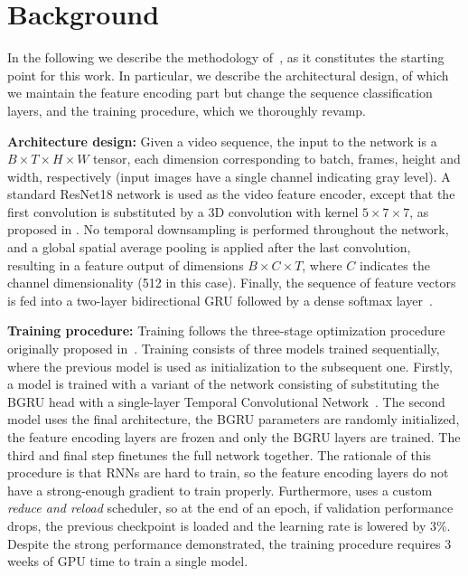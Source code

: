 \documentclass{article}
\begin{document}
\section{Background}

In the following we describe the methodology of~\cite{petridis18}, as it constitutes the starting point for this work. In particular, we describe the architectural design, of which we maintain the feature encoding part but change the sequence classification layers, and the training procedure, which we thoroughly revamp.

\textbf{Architecture design:} Given a video sequence, the input to the network is a $B\times T \times H \times W$ tensor, each dimension corresponding to batch, frames, height and width, respectively (input images have a single channel indicating gray level). A standard ResNet18 network is used as the video feature encoder, except that the first convolution is substituted by a 3D convolution with kernel $5 \times 7 \times 7$, as proposed in \cite{stafylakis17}. No temporal downsampling is performed throughout the network, and a global spatial average pooling is applied after the last convolution, resulting in a feature output of dimensions $B \times C \times T$, where $C$ indicates the channel dimensionality (512 in this case). Finally, the sequence of feature vectors is fed into a two-layer bidirectional GRU followed by a dense softmax layer~\cite{petridis18}. 

\textbf{Training procedure:} Training follows the three-stage optimization procedure originally proposed in~\cite{stafylakis17}. Training consists of three models trained sequentially, where the previous model is used as initialization to the subsequent one. Firstly, a model is trained with a variant of the network consisting of substituting the BGRU head with a single-layer Temporal Convolutional Network~\cite{BaiTCN2018}. The second model uses the final architecture, the BGRU parameters are randomly initialized, the feature encoding layers are frozen and only the BGRU layers are trained. The third and final step finetunes the full network together. The rationale of this procedure is that RNNs are hard to train, so the feature encoding layers do not have a strong-enough gradient to train properly. Furthermore, \cite{petridis18} uses a custom \textit{reduce and reload} scheduler, so at the end of an epoch, if validation performance drops, the previous checkpoint is loaded and the learning rate is lowered by 3\%. Despite the strong performance demonstrated, the training procedure requires 3 weeks of GPU time to train a single model.
\end{document}
